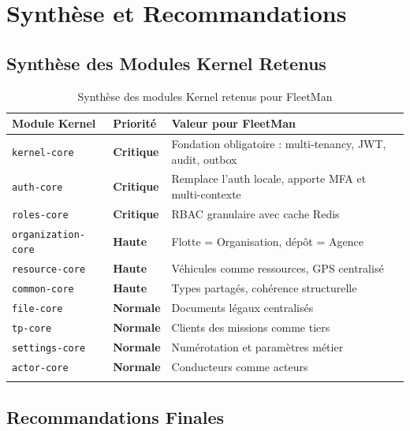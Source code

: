 \documentclass[12pt,a4paper]{report}
\begin{document}
\chapter{Synthèse et Recommandations}

\section{Synthèse des Modules Kernel Retenus}

\begin{longtable}{p{3.5cm}p{3cm}p{7cm}}
\toprule
\textbf{Module Kernel} & \textbf{Priorité} & \textbf{Valeur pour FleetMan} \\
\midrule
\endhead
\texttt{kernel-core} & \textcolor{fleeterror}{\textbf{Critique}} &
  Fondation obligatoire : multi-tenancy, JWT, audit, outbox \\
\texttt{auth-core} & \textcolor{fleeterror}{\textbf{Critique}} &
  Remplace l'auth locale, apporte MFA et multi-contexte \\
\texttt{roles-core} & \textcolor{fleeterror}{\textbf{Critique}} &
  RBAC granulaire avec cache Redis \\
\texttt{organization-core} & \textcolor{fleetwarning}{\textbf{Haute}} &
  Flotte = Organisation, dépôt = Agence \\
\texttt{resource-core} & \textcolor{fleetwarning}{\textbf{Haute}} &
  Véhicules comme ressources, GPS centralisé \\
\texttt{common-core} & \textcolor{fleetwarning}{\textbf{Haute}} &
  Types partagés, cohérence structurelle \\
\texttt{file-core} & \textcolor{fleetsuccess}{\textbf{Normale}} &
  Documents légaux centralisés \\
\texttt{tp-core} & \textcolor{fleetsuccess}{\textbf{Normale}} &
  Clients des missions comme tiers \\
\texttt{settings-core} & \textcolor{fleetsuccess}{\textbf{Normale}} &
  Numérotation et paramètres métier \\
\texttt{actor-core} & \textcolor{fleetsuccess}{\textbf{Normale}} &
  Conducteurs comme acteurs \\
\bottomrule
\caption{Synthèse des modules Kernel retenus pour FleetMan}
\end{longtable}

\section{Recommandations Finales}
\end{document}
